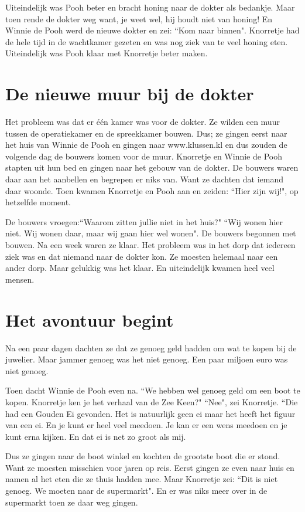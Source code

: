 \documentclass{article}
\begin{document}
Uiteindelijk was Pooh beter en bracht honing naar de dokter als bedankje. Maar toen rende de dokter weg want, je weet wel, hij houdt niet van honing! En Winnie de Pooh werd de nieuwe dokter en zei: ``Kom naar binnen". Knorretje had de hele tijd in de wachtkamer gezeten en was nog ziek van te veel honing eten. Uiteindelijk was Pooh klaar met Knorretje beter maken.

\section{De nieuwe muur bij de dokter}

Het probleem was dat er één kamer was voor de dokter. Ze wilden een muur tussen de operatiekamer en de spreekkamer bouwen. Dus; ze gingen eerst naar het huis van Winnie de Pooh en gingen naar www.klussen.kl en dus zouden de volgende dag de bouwers komen voor de muur. Knorretje en Winnie de Pooh stapten uit hun bed en gingen naar het gebouw van de dokter. De bouwers waren daar aan het aanbellen en begrepen er niks van. Want ze dachten dat iemand daar woonde. Toen kwamen Knorretje en Pooh aan en zeiden: ``Hier zijn wij!", op hetzelfde moment.

De bouwers vroegen:``Waarom zitten jullie niet in het huis?" ``Wij wonen hier niet. Wij wonen daar, maar wij gaan hier wel wonen". De bouwers begonnen met bouwen. Na een week waren ze klaar. Het probleem was in het dorp dat iedereen ziek was en dat niemand naar de dokter kon. Ze moesten helemaal naar een ander dorp. Maar gelukkig was het klaar. En uiteindelijk kwamen heel veel mensen.

\section{Het avontuur begint}

Na een paar dagen dachten ze dat ze genoeg geld hadden om wat te kopen bij de juwelier. Maar jammer genoeg was het niet genoeg. Een paar miljoen euro was niet genoeg.

Toen dacht Winnie de Pooh even na. ``We hebben wel genoeg geld om een boot te kopen. Knorretje ken je het verhaal van de Zee Keen?" ``Nee", zei Knorretje. ``Die had een Gouden Ei gevonden. Het is natuurlijk geen ei maar het heeft het figuur van een ei. En je kunt er heel veel meedoen. Je kan er een wens meedoen en je kunt erna kijken. En dat ei is net zo groot als mij.

Dus ze gingen naar de boot winkel en kochten de grootste boot die er stond. Want ze moesten misschien voor jaren op reis. Eerst gingen ze even naar huis en namen al het eten die ze thuis hadden mee. Maar Knorretje zei: ``Dit is niet genoeg. We moeten naar de supermarkt". En er was niks meer over in de supermarkt toen ze daar weg gingen.
\end{document}
